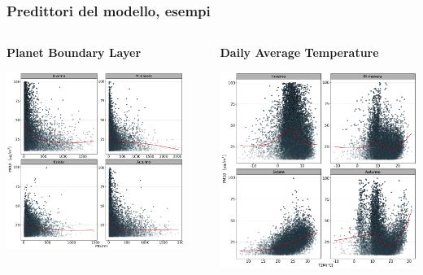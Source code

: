 \documentclass{beamer}
\begin{document}
\begin{frame}
\frametitle{Predittori del modello, esempi}
\begin{columns}
\begin{column}{0.5\textwidth}
\centerline{\textbf{Planet Boundary Layer}}
\includegraphics[width=0.9\textwidth]{pbl00.png}
\end{column}
\begin{column}{0.5\textwidth}
\centerline{\textbf{Daily Average Temperature}}
\includegraphics[height=0.9\textwidth]{t2m.png}
\end{column}
\end{columns}
\end{frame}
\end{document}
